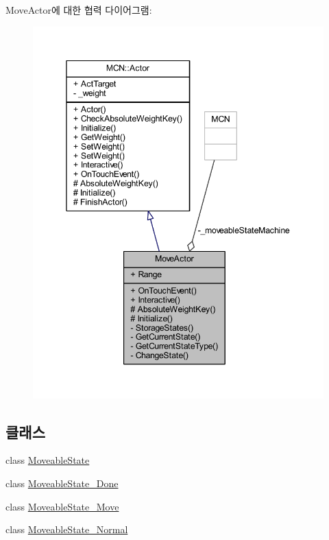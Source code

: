 Move\+Actor에 대한 협력 다이어그램\+:\nopagebreak
\begin{figure}[H]
\begin{center}
\leavevmode
\includegraphics[width=345pt]{class_move_actor__coll__graph}
\end{center}
\end{figure}
\subsection*{클래스}
\begin{DoxyCompactItemize}
\item 
class \hyperlink{class_move_actor_1_1_moveable_state}{Moveable\+State}
\item 
class \hyperlink{class_move_actor_1_1_moveable_state___done}{Moveable\+State\+\_\+\+Done}
\item 
class \hyperlink{class_move_actor_1_1_moveable_state___move}{Moveable\+State\+\_\+\+Move}
\item 
class \hyperlink{class_move_actor_1_1_moveable_state___normal}{Moveable\+State\+\_\+\+Normal}
\end{DoxyCompactItemize}
